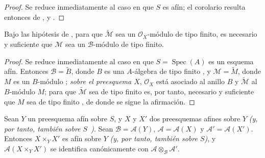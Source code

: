 \documentclass[oneside,10pt]{amsart}
\let\EGAOriginalLabel\label
\renewcommand{\label}[1]{\phantomsection\EGAOriginalLabel{#1}}
\begin{document}
\begin{proof}
Se reduce inmediatamente al caso en que $S$ es afín; el corolario resulta entonces de ,  y .
\end{proof}

\begin{corollary}[1.4.5]
\label{II.1.4.5-fr}
Bajo las hipótesis de , para que $\widetilde{\mathcal{M}}$ sea un $\mathcal{O}_X$-módulo de tipo finito, es necesario y suficiente que $\mathcal{M}$ sea un $\mathcal{B}$-módulo de tipo finito.
\end{corollary}

\begin{proof}
Se reduce inmediatamente al caso en que $S=\operatorname{Spec}(A)$ es un esquema afín.
Entonces $\mathcal{B}=\widetilde{B}$, donde $B$ es una $A$-álgebra de tipo finito , y $\mathcal{M}=\widetilde{M}$, donde $M$ es un $B$-módulo ; \emph{sobre el preesquema $X$}, $\mathcal{O}_X$ está asociado al anillo $B$ y $\widetilde{\mathcal{M}}$ al $B$-módulo $M$; para que $\widetilde{\mathcal{M}}$ sea de tipo finito es, por tanto, necesario y suficiente que $M$ sea de tipo finito , de donde se sigue la afirmación.
\end{proof}

\begin{proposition}[1.4.6]
\label{II.1.4.6-fr}
Sean $Y$ un preesquema afín sobre $S$, y $X$ y $X'$ dos preesquemas afines sobre $Y$ \emph{(y, por tanto, también sobre $S$~)}.
Sean $\mathcal{B}=\mathcal{A}(Y)$, $\mathcal{A}=\mathcal{A}(X)$ y $\mathcal{A}'=\mathcal{A}(X')$.
Entonces $X\times_Y X'$ es afín sobre $Y$ \emph{(y, por tanto, también sobre $S$)}, y $\mathcal{A}(X\times_Y X')$ se identifica canónicamente con $\mathcal{A}\otimes_{\mathcal{B}}\mathcal{A}'$.
\end{proposition}
\end{document}
